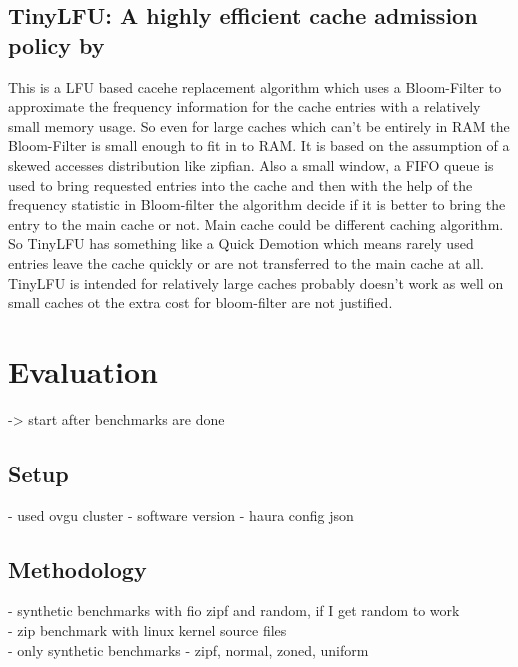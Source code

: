 \documentclass[
	12pt,
	a4paper,
	abstract,
	bibliography=totoc,
	chapterprefix,
	headings=openright,
	numbers=endperiod,
	parskip=half,
	twoside,
]{scrreprt}
\begin{document}
\section*{TinyLFU: A highly efficient cache admission policy by \cite{einziger2017tinylfu}}

This is a LFU based cacehe replacement algorithm which uses a Bloom-Filter to approximate the frequency information for the cache entries with a relatively small memory usage.
So even for large caches which can't be entirely in RAM the Bloom-Filter is small enough to fit in to RAM.
It is based on the assumption of a skewed accesses distribution like zipfian.
Also a small window, a FIFO queue is used to bring requested entries into the cache and then
with the help of the frequency statistic in Bloom-filter the algorithm decide if it is better to bring the entry to the main cache or not. Main cache could be different caching algorithm.
So TinyLFU has something like a Quick Demotion which means rarely used entries leave the cache quickly or are not transferred to the main cache at all.
TinyLFU is intended for relatively large caches probably doesn't work as well on small caches ot the extra cost for bloom-filter are not justified.


\chapter{Evaluation}
\label{cha:evaluation}



-> start after benchmarks are done

\section{Setup}

- used ovgu cluster
- software version 
- haura config json


\section{Methodology}
- synthetic benchmarks with fio zipf and random, if I get random to work\\
- zip benchmark with linux kernel source files\\
- only synthetic benchmarks 
- zipf, normal, zoned, uniform 
\end{document}
